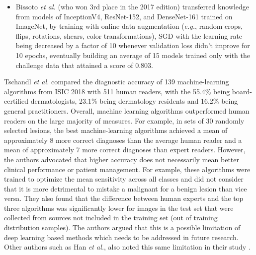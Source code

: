 \begin{itemize}
        \item Bissoto \textit{et al.} \cite{Bissoto2018} (who won 3rd place in the 2017 edition) transferred knowledge from models of InceptionV4, ResNet-152, and DenseNet-161 trained on ImageNet, by training with online data augmentation (\textit{e.g.}, random crops, flips, rotations, shears, color transformations), SGD with the learning rate being decreased by a factor of 10 whenever validation loss didn’t improve for 10 epochs, eventually building an average of 15 models trained only with the challenge data that attained a score of 0.803.
    \end{itemize}
    
    Tschandl \textit{et al.} \cite{humanvsisic2018} compared the diagnostic accuracy of 139 machine-learning algorithms from \ac{ISIC} 2018 with 511 human readers, with the 55.4\% being board-certified dermatologists, 23.1\% being dermatology residents and 16.2\% being general practitioners. Overall, machine learning algorithms outperformed human readers on the large majority of measures. For example, in sets of 30 randomly selected lesions, the best machine-learning algorithms achieved a mean of approximately 8 more correct diagnoses than the average human reader and a mean of approximately 7 more correct diagnoses than expert readers. However, the authors advocated that higher accuracy does not necessarily mean better clinical performance or patient management. For example, these algorithms were trained to optimize the mean sensitivity across all classes and did not consider that it is more detrimental to mistake a malignant for a benign lesion than vice versa. They also found that the difference between human experts and the top three algorithms was significantly lower for images in the test set that were collected from sources not included in the training set (out of training distribution samples). The authors argued that this is a possible limitation of deep learning based methods which needs to be addressed in future research. Other authors such as Han \textit{et al.}, also noted this same limitation in their study \cite{Han2018}. \par 
    
